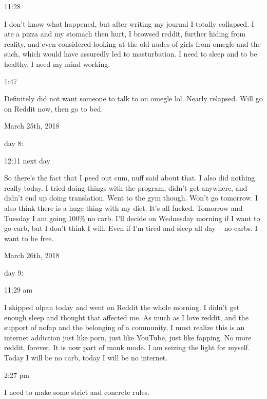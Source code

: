 11:28

I don't know what happened, but after writing my journal I totally
collapsed. I ate a pizza and my stomach then hurt, I browsed reddit,
further hiding from reality, and even considered looking at the old
nudes of girls from omegle and the such, which would have assuredly led
to masturbation. I need to sleep and to be healthy. I need my mind
working.

1:47

Definitely did not want someone to talk to on omegle lol. Nearly
relapsed. Will go on Reddit now, then go to bed.

\bigskip
\bigskip
March 25th, 2018

day 8:

12:11 next day

So there's the fact that I peed out cum, nuff said about that. I also
did nothing really today. I tried doing things with the program, didn't
get anywhere, and didn't end up doing translation. Went to the gym
though. Won't go tomorrow. I also think there is a huge thing with my
diet. It's all fucked. Tomorrow and Tuesday I am going 100\% no carb.
I'll decide on Wednesday morning if I want to go carb, but I don't think
I will. Even if I'm tired and sleep all day -- no carbs. I want to be
free.

\bigskip
\bigskip
March 26th, 2018

day 9:

11:29 am

I skipped ulpan today and went on Reddit the whole morning. I didn't get
enough sleep and thought that affected me. As much as I love reddit, and
the support of nofap and the belonging of a community, I must realize
this is an internet addiction just like porn, just like YouTube, just
like fapping. No more reddit, forever. It is now part of monk mode. I am
seizing the light for myself. Today I will be no carb, today I will be
no internet.

2:27 pm

I need to make some strict and concrete rules.


